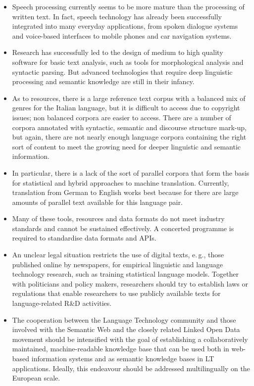 \documentclass[]{../../metanetpaper}
\begin{document}
\begin{multicols}{2}
\begin{itemize}
\item Speech processing currently seems to be more mature than the processing of written text. In fact, speech technology has already been successfully integrated into many everyday applications, from spoken dialogue systems and voice-based interfaces to mobile phones and car navigation systems. 
\item Research has successfully led to the design of medium to high quality software for basic text analysis, such as tools for morphological analysis and syntactic parsing. But advanced technologies that require deep linguistic processing and semantic knowledge are still in their infancy. 
\item As to resources, there is a large reference text corpus with a balanced mix of genres for the Italian language, but it is difficult to access due to copyright issues; non balanced corpora are easier to access. There are a number of corpora annotated with syntactic, semantic and discourse structure mark-up, but again, there are not nearly enough language corpora containing the right sort of content to meet the growing need for deeper linguistic and semantic information. 
\item In particular, there is a lack of the sort of parallel corpora that form the basis for statistical and hybrid approaches to machine translation. Currently, translation from German to English works best because for there are large amounts of parallel text available for this language pair. 
\item Many of these tools, resources and data formats do not meet industry standards and cannot be sustained effectively. A concerted programme is required to standardise data formats and APIs.
\item An unclear legal situation restricts the use of digital texts, e.\,g., those published online by newspapers, for empirical linguistic and language technology research, such as training statistical language models. Together with politicians and policy makers, researchers should try to establish laws or regulations that enable researchers to use publicly available texts for language-related R\&D activities.
\item The cooperation between the Language Technology community and those involved with the Semantic Web and the closely related Linked Open Data movement should be intensified with the goal of establishing a collaboratively maintained, machine-readable knowledge base that can be used both in web-based information systems and as semantic knowledge bases in LT applications. Ideally, this endeavour should be addressed multilingually on the European scale.
\end{itemize}


\end{multicols}
\end{document}
